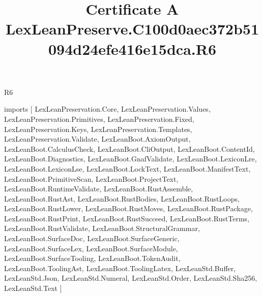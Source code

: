 \begin{lexlean}{R6}
\title{Certificate A LexLeanPreserve.C100d0aec372b51094d24efe416e15dca.R6}
\begin{coremodule}
imports [
  LexLeanPreservation.Core,
  LexLeanPreservation.Values,
  LexLeanPreservation.Primitives,
  LexLeanPreservation.Fixed,
  LexLeanPreservation.Keys,
  LexLeanPreservation.Templates,
  LexLeanPreservation.Validate,
  LexLeanBoot.AxiomOutput,
  LexLeanBoot.CalculusCheck,
  LexLeanBoot.CliOutput,
  LexLeanBoot.ContentId,
  LexLeanBoot.Diagnostics,
  LexLeanBoot.GnafValidate,
  LexLeanBoot.LexiconLre,
  LexLeanBoot.LexiconLse,
  LexLeanBoot.LockText,
  LexLeanBoot.ManifestText,
  LexLeanBoot.PrimitiveScan,
  LexLeanBoot.ProjectText,
  LexLeanBoot.RuntimeValidate,
  LexLeanBoot.RustAssemble,
  LexLeanBoot.RustAst,
  LexLeanBoot.RustBodies,
  LexLeanBoot.RustLoops,
  LexLeanBoot.RustLower,
  LexLeanBoot.RustMoves,
  LexLeanBoot.RustPackage,
  LexLeanBoot.RustPrint,
  LexLeanBoot.RustSucceed,
  LexLeanBoot.RustTerms,
  LexLeanBoot.RustValidate,
  LexLeanBoot.StructuralGrammar,
  LexLeanBoot.SurfaceDoc,
  LexLeanBoot.SurfaceGeneric,
  LexLeanBoot.SurfaceLex,
  LexLeanBoot.SurfaceModule,
  LexLeanBoot.SurfaceTooling,
  LexLeanBoot.TokenAudit,
  LexLeanBoot.ToolingAst,
  LexLeanBoot.ToolingLatex,
  LexLeanStd.Buffer,
  LexLeanStd.Json,
  LexLeanStd.Numeral,
  LexLeanStd.Order,
  LexLeanStd.Sha256,
  LexLeanStd.Text
]


\end{coremodule}
\end{lexlean}
